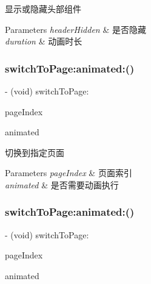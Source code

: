 显示或隐藏头部组件


\begin{DoxyParams}{Parameters}
{\em header\+Hidden} & 是否隐藏 \\
\hline
{\em duration} & 动画时长 \\
\hline
\end{DoxyParams}
\mbox{\label{interface_v_t_magic_view_a419f8745d0c6afd26f97b782a643426e}} 
\subsubsection{\texorpdfstring{switch\+To\+Page\+:animated\+:()}{switchToPage:animated:()}\hspace{0.1cm}{\footnotesize\ttfamily [1/3]}}
{\footnotesize\ttfamily -\/ (void) switch\+To\+Page\+: \begin{DoxyParamCaption}\item[{(N\+S\+U\+Integer)}]{page\+Index }\item[{animated:(B\+O\+OL)}]{animated }\end{DoxyParamCaption}}

切换到指定页面


\begin{DoxyParams}{Parameters}
{\em page\+Index} & 页面索引 \\
\hline
{\em animated} & 是否需要动画执行 \\
\hline
\end{DoxyParams}
\mbox{\label{interface_v_t_magic_view_a419f8745d0c6afd26f97b782a643426e}} 
\subsubsection{\texorpdfstring{switch\+To\+Page\+:animated\+:()}{switchToPage:animated:()}\hspace{0.1cm}{\footnotesize\ttfamily [2/3]}}
{\footnotesize\ttfamily -\/ (void) switch\+To\+Page\+: \begin{DoxyParamCaption}\item[{(N\+S\+U\+Integer)}]{page\+Index }\item[{animated:(B\+O\+OL)}]{animated }\end{DoxyParamCaption}}

